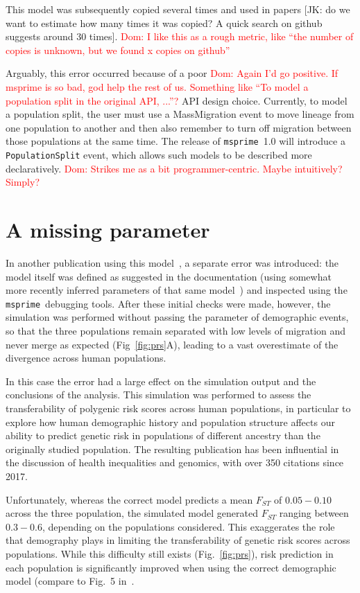 \documentclass{article}
\newcommand{\msprime}[0]{\texttt{msprime}}
\newcommand{\dncomment}[1]{{\textcolor{red}{Dom: #1}}}
\begin{document}
This model was subsequently copied
several times and used in papers [JK: do we want to estimate how
many times it was copied? A quick search on github suggests around 30
times]. \dncomment{I like this as a rough metric, like ``the number of copies 
is unknown, but we found x copies on github''}

Arguably, this error occurred because of a poor 
\dncomment{Again I'd go positive. If msprime is so bad, god help the rest of us. 
Something like ``To model a population split in the original API, ...''?}
API design choice.
Currently, to model a population split, the user must use a MassMigration event to move 
lineage from one population to another and then also remember to turn off migration
between those populations at the same time.
The release of \msprime\ 1.0 will introduce a \texttt{PopulationSplit} event, which allows
such models to be described more declaratively. 
\dncomment{Strikes me as a bit programmer-centric. Maybe intuitively? Simply?}

\section{A missing parameter}

In another publication using this model~\citep{martin2017human}, 
a separate error was introduced: the model itself was defined as suggested 
in the documentation (using somewhat more recently inferred parameters of that same
model~\citep{gravel2011demographic}) and inspected using the \msprime\ 
debugging tools. After these initial checks were made, however, the simulation 
was performed without passing the parameter of demographic events,
so that the three populations remain separated with low levels of migration and
never merge as expected (Fig~\ref{fig:prs}A),
leading to a vast overestimate of the divergence across human populations. 

In this case the error had a large effect on the simulation output and 
the conclusions of the analysis. This simulation was performed to assess the 
transferability of polygenic risk scores across human populations, in particular to
explore how human demographic history and population structure affects our ability
to predict genetic risk in populations of different ancestry than the originally studied
population. The resulting publication has been influential in the discussion of 
health inequalities and genomics, with over 350 citations since 2017. 

Unfortunately, whereas the correct model predicts a mean $F_{ST}$ of 
$0.05 - 0.10$ across the three population, the simulated model generated $F_{ST}$
ranging between $0.3 - 0.6$, depending on the populations considered.
This exaggerates the role that demography plays in limiting the transferability
of genetic risk scores across populations. While this difficulty still exists 
(Fig.~\ref{fig:prs}), risk prediction in each population is significantly improved 
when using the correct demographic model (compare to Fig.~5 in~\citet{martin2017human}.
\end{document}
